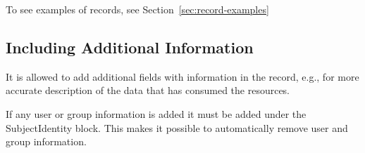 To see examples of records, see Section~\ref{sec:record-examples}


\subsection{Including Additional Information}

It is allowed to add additional fields with information in the record, e.g.,
for more accurate description of the data that has consumed the resources.

If any user or group information is added it must be added under the
SubjectIdentity block. This makes it possible to automatically remove user
and group information.

